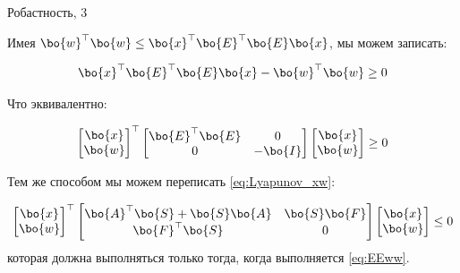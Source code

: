\documentclass{beamer}
\begin{document}
\begin{frame}{Робастность, 3}
	\begin{flushleft}
		
		Имея $\bo{w}^\top \bo{w} 
		\leq
		\bo{x}^\top\bo{E}^\top \bo{E}\bo{x}$, мы можем записать:
		
		\begin{equation}
			\bo{x}^\top\bo{E}^\top \bo{E}\bo{x} - \bo{w}^\top \bo{w} \geq 0
		\end{equation}	
		
		Что эквивалентно:
		
		\begin{equation}
			\label{eq:EEww}
			\begin{bmatrix}
				\bo{x} \\ \bo{w}
			\end{bmatrix}^\top
			\begin{bmatrix}
				\bo{E}^\top \bo{E} & 0 \\
				0 & -\bo{I}
			\end{bmatrix}		
			\begin{bmatrix}
				\bo{x} \\ \bo{w}
			\end{bmatrix}
			\geq 0
		\end{equation}	
		
		Тем же способом мы можем переписать \eqref{eq:Lyapunov_xw}:
		
		\begin{equation}
			\label{eq:xw_Lyapunov}
			\begin{bmatrix}
				\bo{x} \\ \bo{w}
			\end{bmatrix}^\top
			\begin{bmatrix}
				\bo{A}^\top \bo{S} + \bo{S}\bo{A} & \bo{S}\bo{F} \\
				\bo{F}^\top\bo{S} & 0
			\end{bmatrix}
			\begin{bmatrix}
				\bo{x} \\ \bo{w}
			\end{bmatrix}
			\leq 0
		\end{equation}	
		которая должна выполняться только тогда, когда выполняется \eqref{eq:EEww}.
		
	\end{flushleft}
\end{frame}
\end{document}
